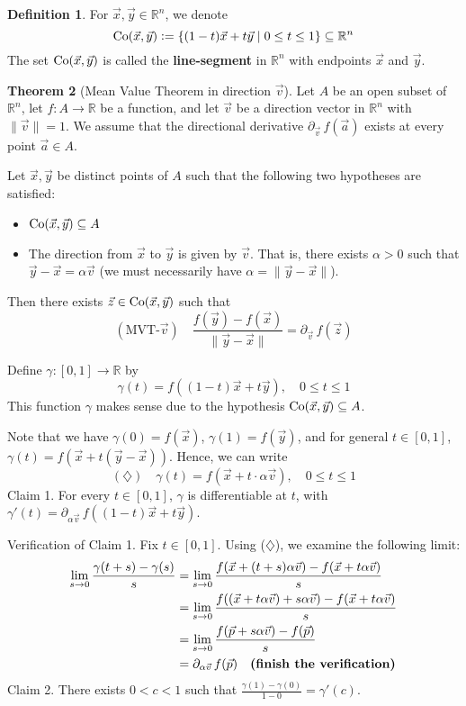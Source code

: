 \documentclass[11pt]{article}
\makeatletter
\theoremstyle{definition}
\newtheorem{thm}{Theorem}[section]
\newtheorem{defn}[thm]{Definition}
\newcommand{\R}{\ensuremath{\mathbb{R}}}
\newenvironment{pf}[1][\proofname]{\par
  \pushQED{\qed}%
  \normalfont \topsep0\p@\relax
  \trivlist
  \item[\hskip\labelsep\itshape
  #1\@addpunct{.}]\ignorespaces
}{%
  \popQED\endtrivlist\@endpefalse
}
\makeatother
\begin{document}
\begin{defn}
For $\vec{x}, \vec{y} \in \R^n$, we denote
$${\rm Co}(\vec{x}, \vec{y}) := \{(1-t)\vec{x} + t\vec{y} \mid 0 \leq t \leq 1\} \subseteq \R^n$$
The set ${\rm Co}(\vec{x}, \vec{y})$ is called the {\bf line-segment} in $\R^n$ with endpoints $\vec{x}$ and $\vec{y}$.
\end{defn}

\begin{thm}[Mean Value Theorem in direction $\vec{v}$]
Let $A$ be an open subset of $\R^n$, let $f : A \to \R$ be a function, and let $\vec{v}$ be a direction vector in $\R^n$ with $\|\vec{v}\| = 1$. We assume that the directional derivative $\partial_{\vec{v}}\,f(\vec{a})$ exists at every point $\vec{a} \in A$.

Let $\vec{x}, \vec{y}$ be distinct points of $A$ such that the following two hypotheses are satisfied:
\vspace{-1.5ex}\begin{itemize}
    \item ${\rm Co}(\vec{x}, \vec{y}) \subseteq A$
    \item The direction from $\vec{x}$ to $\vec{y}$ is given by $\vec{v}$. That is, there exists $\alpha > 0$ such that $\vec{y} - \vec{x} = \alpha\vec{v}$ (we must necessarily have $\alpha = \|\vec{y} - \vec{x}\|$).
\end{itemize}\vspace{-1.5ex}
Then there exists $\vec{z} \in {\rm Co}(\vec{x}, \vec{y})$ such that
$$(\text{MVT-}\vec{v}) \quad \frac{f(\vec{y}) - f(\vec{x})}{\|\vec{y}-\vec{x}\|} = \partial_{\vec{v}}\,f(\vec{z})$$
\begin{pf}
Define $\gamma : [0, 1] \to \R$ by
$$\gamma(t) = f((1-t)\vec{x} + t\vec{y}), \quad 0 \leq t \leq 1$$
This function $\gamma$ makes sense due to the hypothesis ${\rm Co}(\vec{x}, \vec{y}) \subseteq A$.

Note that we have $\gamma(0) = f(\vec{x})$, $\gamma(1) = f(\vec{y})$, and for general $t \in [0, 1]$, $\gamma(t) = f(\vec{x} + t(\vec{y} - \vec{x}))$. Hence, we can write
$$(\diamondsuit) \quad \gamma(t) = f(\vec{x} + t \cdot \alpha\vec{v}), \quad 0 \leq t \leq 1$$
{\sc Claim 1.} For every $t \in [0, 1]$, $\gamma$ is differentiable at $t$, with $\gamma'(t) = \partial_{\alpha\vec{v}}\,f((1-t)\vec{x} + t\vec{y})$.

{\sc Verification of Claim 1.} Fix $t \in [0, 1]$. Using ($\diamondsuit$), we examine the following limit:
\begin{align*}
    \lim_{s\to0} \frac{\gamma(t+s) - \gamma(s)}s
    &= \lim_{s\to0} \frac{f(\vec{x} + (t+s)\alpha\vec{v}) - f(\vec{x} + t \alpha\vec{v})}s \\
    &= \lim_{s\to0} \frac{f((\vec{x} + t\alpha\vec{v}) + s\alpha\vec{v}) - f(\vec{x} + t\alpha\vec{v})}s \\
    &= \lim_{s\to0} \frac{f(\vec{p} + s\alpha\vec{v}) - f(\vec{p})}s \\
    &= \partial_{\alpha\vec{v}}\,f(\vec{p}) \quad \text{{\bf (finish the verification)}}
\end{align*}
{\sc Claim 2.} There exists $0 < c < 1$ such that $\frac{\gamma(1) - \gamma(0)}{1-0} = \gamma'(c)$.


\end{pf}
\end{thm}
\end{document}
